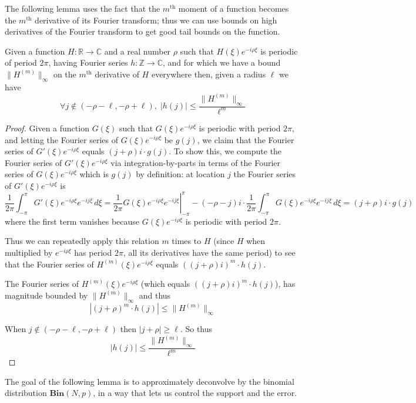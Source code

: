 \documentclass[11pt]{article}
\theoremstyle{plain}
\newcommand{\Bin}[2]{\textbf{Bin}(#1,#2)}
\begin{document}
The following lemma uses the fact that the $m^{\textrm{th}}$ moment of a function becomes the $m^{\textrm{th}}$ derivative of its Fourier transform; thus we can use bounds on high derivatives of the Fourier transform to get good tail bounds on the function.

\begin{lemma}\label{lem:h-local}
Given a function $H:\mathbb{R}\rightarrow\mathbb{C}$ and a real number $\rho$ such that $H(\xi)e^{-i \rho \xi}$ is periodic of period $2\pi$, having Fourier series $h:\mathbb{Z}\rightarrow\mathbb{C}$, and for which we have a bound $\|H^{(m)}\|_{\infty}$ on the $m^{\textrm{th}}$ derivative of $H$ everywhere then, given a radius $\ell$ we have 
\[\forall j\notin (-\rho-\ell,-\rho+\ell),\;|h(j)|\leq \frac{\|H^{(m)}\|_{\infty}}{\ell^m}\]
\end{lemma}

\begin{proof}
Given a function $G(\xi)$ such that $G(\xi)e^{-i\rho\xi}$ is periodic with period $2\pi$, and letting the Fourier series of $G(\xi)e^{-i\rho\xi}$ be $g(j)$, we claim that the Fourier series of $G'(\xi)e^{-i\rho\xi}$ equals $(j+\rho)i\cdot g(j)$. To show this, we compute the Fourier series of $G'(\xi)e^{-i\rho\xi}$ via integration-by-parts in terms of the Fourier series of $G(\xi)e^{-i\rho\xi}$ which is $g(j)$ by definition: at location $j$ the Fourier series of $G'(\xi)e^{-i\rho\xi}$ is \[\frac{1}{2\pi}\int_{-\pi}^\pi G'(\xi)e^{-i\rho\xi} e^{-ij\xi}\,d\xi=\left.\frac{1}{2\pi}G(\xi)e^{-i\rho\xi} e^{-ij\xi}\right|_{-\pi}^\pi-(-\rho-j)i\cdot\frac{1}{2\pi}\int_{-\pi}^\pi G(\xi)e^{-i\rho\xi} e^{-ij\xi}\,d\xi=(j+\rho)i\cdot g(j)\]
where the first term vanishes because $G(\xi)e^{-i\rho\xi}$ is periodic with period $2\pi$.

Thus we can repeatedly apply this relation $m$ times to $H$ (since $H$ when multiplied by $e^{-i\rho\xi}$ has period $2\pi$, all its derivatives have the same period) to see that the Fourier series of $H^{(m)}(\xi)e^{-i\rho\xi}$ equals $((j+\rho)i)^m\cdot h(j)$.

The Fourier series of $H^{(m)}(\xi)e^{-i\rho\xi}$ (which equals $((j+\rho)i)^m\cdot h(j)$), has magnitude bounded by $\|H^{(m)}\|_{\infty}$ and thus \[|(j+\rho)^m\cdot h(j)|\leq  \|H^{(m)}\|_{\infty}\]

When $j\notin (-\rho-\ell,-\rho+\ell)$ then $|j+\rho|\geq \ell$. So thus
\[|h(j)|\leq \frac{\|H^{(m)}\|_{\infty}}{\ell^m}\]
\end{proof}


The goal of the following lemma is to approximately deconvolve by the binomial distribution $\Bin{N}{p}$, in a way that lets us control the support and the error.
\end{document}
